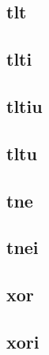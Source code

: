 \subsection*{tlt}

\subsection*{tlti}

\subsection*{tltiu}

\subsection*{tltu}

\subsection*{tne}

\subsection*{tnei}

\subsection*{xor}

\subsection*{xori}